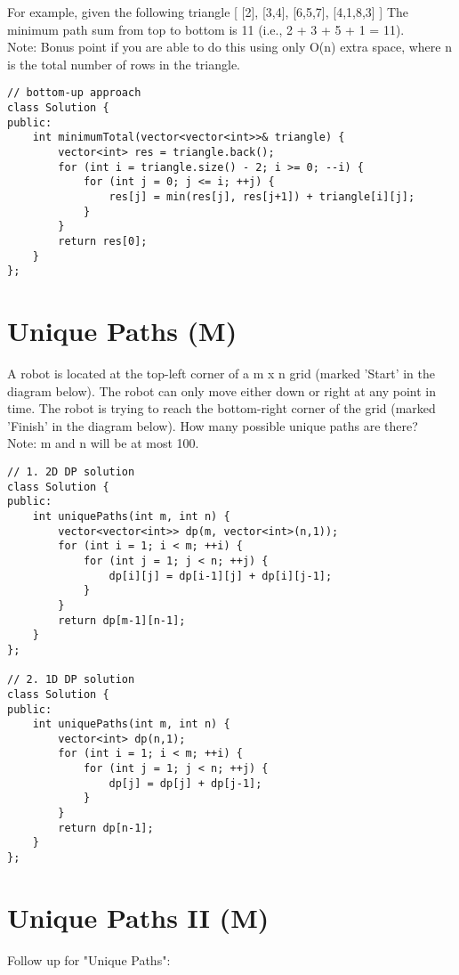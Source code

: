 For example, given the following triangle
[
     [2],
    [3,4],
   [6,5,7],
  [4,1,8,3]
]
The minimum path sum from top to bottom is 11 (i.e., 2 + 3 + 5 + 1 = 11).\\

Note:
Bonus point if you are able to do this using only O(n) extra space, where n is the total number of rows in the triangle. \\

\begin{lstlisting}
// bottom-up approach
class Solution {
public:
    int minimumTotal(vector<vector<int>>& triangle) {
        vector<int> res = triangle.back();
        for (int i = triangle.size() - 2; i >= 0; --i) {
            for (int j = 0; j <= i; ++j) {
                res[j] = min(res[j], res[j+1]) + triangle[i][j];
            }
        }
        return res[0];
    }
};
\end{lstlisting}


\section{Unique Paths (M)}
A robot is located at the top-left corner of a m x n grid (marked 'Start' in the diagram below). The robot can only move either down or right at any point in time. The robot is trying to reach the bottom-right corner of the grid (marked 'Finish' in the diagram below). How many possible unique paths are there?\\

Note: m and n will be at most 100.\\

\begin{lstlisting}
// 1. 2D DP solution
class Solution {
public:
    int uniquePaths(int m, int n) {
        vector<vector<int>> dp(m, vector<int>(n,1));
        for (int i = 1; i < m; ++i) {
            for (int j = 1; j < n; ++j) {
                dp[i][j] = dp[i-1][j] + dp[i][j-1];
            }
        }
        return dp[m-1][n-1];
    }
};

// 2. 1D DP solution
class Solution {
public:
    int uniquePaths(int m, int n) {
        vector<int> dp(n,1);
        for (int i = 1; i < m; ++i) {
            for (int j = 1; j < n; ++j) {
                dp[j] = dp[j] + dp[j-1];
            }
        }
        return dp[n-1];
    }
};
\end{lstlisting}


\section{Unique Paths II (M)}
Follow up for "Unique Paths":

